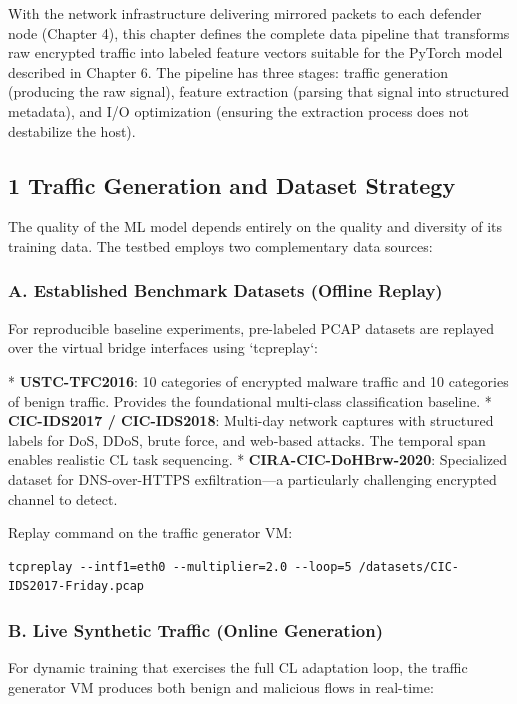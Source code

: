 \documentclass[conference]{IEEEtran}
\begin{document}
With the network infrastructure delivering mirrored packets to each defender node (Chapter 4), this chapter defines the complete data pipeline that transforms raw encrypted traffic into labeled feature vectors suitable for the PyTorch model described in Chapter 6. The pipeline has three stages: traffic generation (producing the raw signal), feature extraction (parsing that signal into structured metadata), and I/O optimization (ensuring the extraction process does not destabilize the host).


\subsection{1 Traffic Generation and Dataset Strategy}

The quality of the ML model depends entirely on the quality and diversity of its training data. The testbed employs two complementary data sources:


\subsubsection{A. Established Benchmark Datasets (Offline Replay)}

For reproducible baseline experiments, pre-labeled PCAP datasets are replayed over the virtual bridge interfaces using `tcpreplay`:

* \textbf{USTC-TFC2016}: 10 categories of encrypted malware traffic and 10 categories of benign traffic. Provides the foundational multi-class classification baseline.
* \textbf{CIC-IDS2017 / CIC-IDS2018}: Multi-day network captures with structured labels for DoS, DDoS, brute force, and web-based attacks. The temporal span enables realistic CL task sequencing.
* \textbf{CIRA-CIC-DoHBrw-2020}: Specialized dataset for DNS-over-HTTPS exfiltration—a particularly challenging encrypted channel to detect.

Replay command on the traffic generator VM:

\begin{verbatim}
tcpreplay --intf1=eth0 --multiplier=2.0 --loop=5 /datasets/CIC-IDS2017-Friday.pcap
\end{verbatim}


\subsubsection{B. Live Synthetic Traffic (Online Generation)}

For dynamic training that exercises the full CL adaptation loop, the traffic generator VM produces both benign and malicious flows in real-time:
\end{document}
